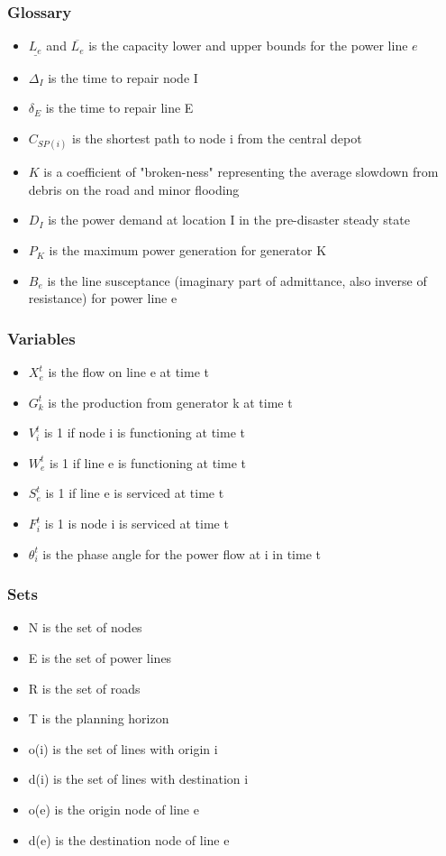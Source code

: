 \documentclass{article}
\begin{document}
	\subsubsection{Glossary}
	\begin{itemize}
		\item $\underline{L_e}$ and $\overline{L_e}$ is the capacity lower and upper bounds for the power line $e$
		\item $\Delta_{I}$ is the time to repair node I
		\item $\delta_{E}$ is the time to repair line E
		\item $C_{SP(i)}$ is the shortest path to node i from the central depot
		\item $K$ is a coefficient of "broken-ness" representing the average slowdown from debris on the road and minor flooding
		\item $D_I$ is the power demand at location I in the pre-disaster steady state
		\item $P_K$ is the maximum power generation for generator K
		\item $B_e$ is the line susceptance (imaginary part of admittance, also inverse of resistance) for power line e
	\end{itemize}
	\subsubsection{Variables}
	\begin{itemize}
		
		\item $X_{e}^{t}$ is the flow on line e at time t
		\item $G_{k}^t$ is the production from generator k at time t
		\item $V_i^t$ is 1 if node i is functioning at time t
		\item $W_{e}^t$ is 1 if line e is functioning at time t
		\item $S_{e}^t$ is 1 if line e is serviced at time t
		\item $F_i^t$ is 1 is node i is serviced at time t 
		\item $\theta_i^t$ is the phase angle for the power flow at i in time t
		
	\end{itemize}
	\subsubsection{Sets}
	\begin{itemize}
		\item N is the set of nodes
		\item E is the set of power lines
		\item R is the set of roads
		\item T is the planning horizon
		\item o(i) is the set of lines with origin i
		\item d(i) is the set of lines with destination i
		\item o(e) is the origin node of line e
		\item d(e) is the destination node of line e
	\end{itemize}
\end{document}
